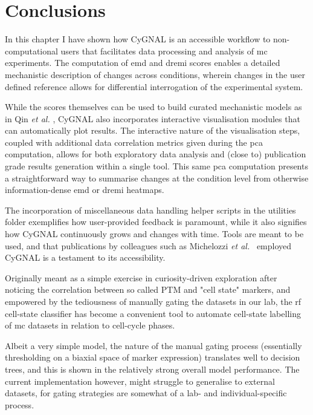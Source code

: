 \newpage
\section{Conclusions}

In this chapter I have shown how CyGNAL is an accessible workflow to non-computational users that facilitates data processing and analysis of \acrshort{mc} experiments. The computation of \acrshort{emd} and \acrshort{dremi} scores enables a detailed mechanistic description of changes across conditions, wherein changes in the user defined reference allows for differential interrogation of the experimental system. 

While the scores themselves can be used to build curated mechanistic models as in Qin \emph{et al.} \cite{qin_cell-type-specific_2020}, CyGNAL also incorporates interactive visualisation modules that can automatically plot results. The interactive nature of the visualisation steps, coupled with additional data correlation metrics given during the \acrshort{pca} computation, allows for both exploratory data analysis and (close to) publication grade results generation within a single tool. This same \acrshort{pca} computation presents a straightforward way to summarise changes at the condition level from otherwise information-dense \acrshort{emd} or \acrshort{dremi} heatmaps.

The incorporation of miscellaneous data handling helper scripts in the utilities folder exemplifies how user-provided feedback is paramount, while it also signifies how CyGNAL continuously grows and changes with time. Tools are meant to be used, and that publications by colleagues such as Michelozzi \emph{et al.}~\cite{michelozzi_activation_2023} employed CyGNAL is a testament to its accessibility.

Originally meant as a simple exercise in curiosity-driven exploration after noticing the correlation between so called PTM and "cell state" markers, and empowered by the tediousness of manually gating the datasets in our lab, the \acrshort{rf} cell-state classifier has become a convenient tool to automate cell-state labelling of \acrshort{mc} datasets in relation to cell-cycle phases.

Albeit a very simple model, the nature of the manual gating process (essentially thresholding on a biaxial space of marker expression) translates well to decision trees, and this is shown in the relatively strong overall model performance. The current implementation however, might struggle to generalise to external datasets, for gating strategies are somewhat of a lab- and individual-specific process.

